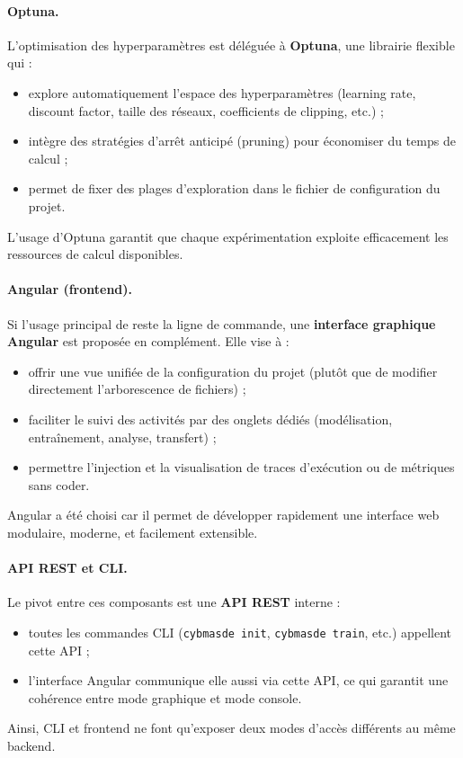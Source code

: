 \paragraph{Optuna.}
L’optimisation des hyperparamètres est déléguée à \textbf{Optuna}, une librairie flexible qui :
\begin{itemize}
  \item explore automatiquement l’espace des hyperparamètres (learning rate, discount factor, taille des réseaux, coefficients de clipping, etc.) ;
  \item intègre des stratégies d’arrêt anticipé (pruning) pour économiser du temps de calcul ;
  \item permet de fixer des plages d’exploration dans le fichier de configuration du projet.
\end{itemize}
L’usage d’Optuna garantit que chaque expérimentation exploite efficacement les ressources de calcul disponibles.

\paragraph{Angular (frontend).}
Si l’usage principal de  reste la ligne de commande, une \textbf{interface graphique Angular} est proposée en complément.
Elle vise à :
\begin{itemize}
  \item offrir une vue unifiée de la configuration du projet (plutôt que de modifier directement l’arborescence de fichiers) ;
  \item faciliter le suivi des activités par des onglets dédiés (modélisation, entraînement, analyse, transfert) ;
  \item permettre l’injection et la visualisation de traces d’exécution ou de métriques sans coder.
\end{itemize}
Angular a été choisi car il permet de développer rapidement une interface web modulaire, moderne, et facilement extensible.

\paragraph{API REST et CLI.}
Le pivot entre ces composants est une \textbf{API REST} interne :
\begin{itemize}
  \item toutes les commandes CLI (\texttt{cybmasde init}, \texttt{cybmasde train}, etc.) appellent cette API ;
  \item l’interface Angular communique elle aussi via cette API, ce qui garantit une cohérence entre mode graphique et mode console.
\end{itemize}
Ainsi, CLI et frontend ne font qu’exposer deux modes d’accès différents au même backend.

